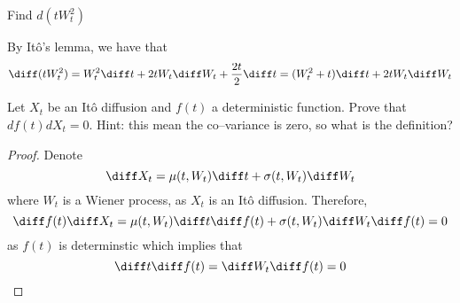     \problem
    \begin{question}
        Find $d(tW_t^2)$
    \end{question}
    By It\^o's lemma, we have that
    \[\diff (tW_t^2)=W_t^2\diff t+2tW_t\diff W_t+\frac{2t}{2}\diff t
    =(W_t^2+t)\diff t+2tW_t\diff W_t\]

    \problem
    \begin{question}
        Let $X_t$ be an It\^o diffusion and $f(t)$ a deterministic function.
        Prove that $df(t)dX_t=0$.  Hint: this mean the co--variance is zero,
        so what is the definition?
    \end{question}
    \begin{proof}
        Denote
        \[\diff X_t=\mu(t,W_t)\diff t+\sigma(t,W_t)\diff W_t\]
        where $W_t$ is a Wiener process, as $X_t$ is an It\^o diffusion.
        Therefore,
        \[\diff f(t)\diff X_t=\mu(t,W_t)\diff t\diff f(t)
        +\sigma(t,W_t)\diff W_t\diff f(t)=0\]
        as $f(t)$ is determinstic which implies that
        \[\diff t\diff f(t)=\diff W_t\diff f(t)=0\]
    \end{proof}

